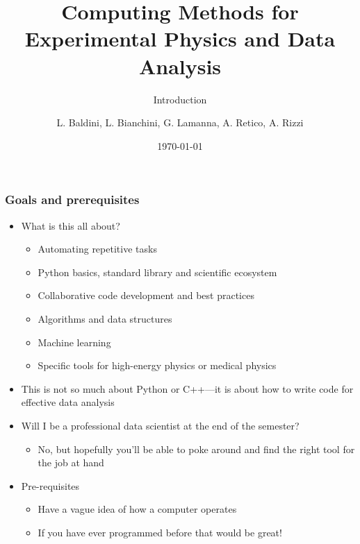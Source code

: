 \documentclass[9pt]{beamer}
\title{\scriptsize Computing Methods for Experimental Physics and Data Analysis}
\subtitle{Introduction}
\date{\today}
\author{L. Baldini, L. Bianchini, G. Lamanna, A. Retico, A. Rizzi}
\institute[UNIPI and INFN]{Universit\`a and INFN--Pisa}
\begin{document}
\titleframe

\begin{frame}
  \frametitle{Goals and prerequisites}
  \begin{itemize}
  \item What is this all about?
    \begin{itemize}
    \item Automating repetitive tasks
    \item Python basics, standard library and scientific ecosystem
    \item Collaborative code development and best practices
    \item Algorithms and data structures
    \item Machine learning
    \item Specific tools for high-energy physics or medical physics
    \end{itemize}
  \item \alert{This is not so much about Python or C++---it is about how to
    write code for effective data analysis}
  \item Will I be a professional data scientist at the end of the semester?
    \begin{itemize}
    \item No, but hopefully you'll be able to poke around and find the right
      tool for the job at hand
    \end{itemize}
  \item Pre-requisites
    \begin{itemize}
    \item Have a vague idea of how a computer operates
    \item If you have ever programmed before that would be
      great!
    \end{itemize}
  \end{itemize}
\end{frame}
\end{document}
